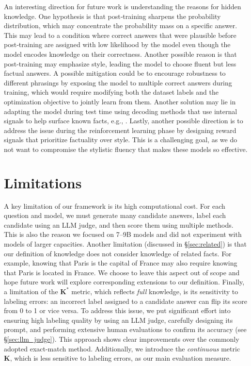 An interesting direction for future work is understanding the reasons for hidden knowledge. 
One hypothesis is that post‑training sharpens the probability distribution, which may concentrate the probability mass on a specific answer. This may lead to a condition where correct answers that were plausible before post‑training are assigned with low likelihood by the model even though the model encodes knowledge on their correctness. Another possible reason is that post-training may emphasize style, leading the model to choose fluent but less factual answers.
A possible mitigation could be to encourage robustness to different phrasings by exposing the model to multiple correct answers during training, which would require modifying both the dataset labels and the optimization objective to jointly learn from them. 
Another solution may lie in adapting the model during test time using decoding methods that use internal signals to help surface known facts, e.g., \citet{rimsky-etal-2024-steering}.
Lastly, another possible direction is to address the issue during the reinforcement learning phase by designing reward signals that prioritize factuality over style. This is a challenging goal, as we do not want to compromise the stylistic fluency that makes these models so effective.






\section{Limitations}

A key limitation of our framework is its high computational cost. For each question and model, we must generate many candidate answers, label each candidate using an LLM judge, and then score them using multiple methods. This is also the reason we focused on 7–9B models and did not experiment with models of larger capacities.
Another limitation (discussed in \S \ref{sec:related}) is that our definition of knowledge does not consider knowledge of related facts. For example, knowing that Paris is the capital of France may also require knowing that Paris is located in France. We choose to leave this aspect out of scope and hope future work will explore corresponding extensions to our definition. Finally, a limitation of the $\mathbf{K^\ast}$ metric, which reflects \textit{full} knowledge, is its sensitivity to labeling errors: an incorrect label assigned to a candidate answer can flip its score from 0 to 1 or vice versa. To address this issue, we put significant effort into ensuring high labeling quality by using an LLM judge, carefully designing its prompt, and performing extensive human evaluations to confirm its accuracy (see \S \ref{sec:llm_judge}). This approach shows clear improvements over the commonly adopted exact-match method. Additionally, we introduce the \textit{continuous} metric $\mathbf{K}$, which is less sensitive to labeling errors, as our main evaluation measure.



